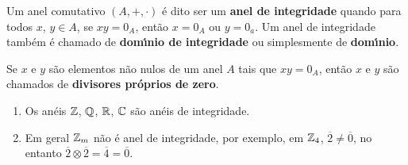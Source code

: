 \documentclass{beamer}
\begin{document}
    \begin{frame}
        \begin{definicao}
            Um anel comutativo $(A, + , \cdot)$ {\'e} dito ser um \textbf{anel de integridade} quando para todos 
            $x$, $y \in A$, se $xy = 0_A$, ent{\~a}o $x = 0_A$ ou $y = 0_a$. Um anel de integridade tamb{\'e}m {\'e} chamado de \textbf{dom{\'\i}nio de integridade} ou simplesmente de \textbf{dom{\'\i}nio}.
        \end{definicao}

        \begin{observacao}
            Se $x$ e $y$ s{\~a}o elementos n{\~a}o nulos de um anel $A$ tais que $xy = 0_A$, ent{\~a}o $x$ e $y$ s{\~a}o chamados de \textbf{divisores pr{\'o}prios de zero}.
        \end{observacao}
    \end{frame}

    \begin{frame}
        \begin{exemplos}
            \begin{enumerate}[label={\arabic*})]
                \item Os an{\'e}is $\mathbb{Z}$, $\mathbb{Q}$, $\mathbb{R}$, $\mathbb{C}$ s{\~a}o an{\'e}is de integridade.
                
                \vspace{.5cm}

                \item Em geral $\mathbb{Z}_m$ n{\~a}o {\'e} anel de integridade, por exemplo, em $\mathbb{Z}_4$, $\overline{2} \neq \overline{0}$, no entanto $\overline{2}\otimes \overline{2} = \overline{4} = \overline{0}$.

                \vspace{.5cm}

                \seti
            \end{enumerate}
        \end{exemplos}
    \end{frame}
\end{document}
